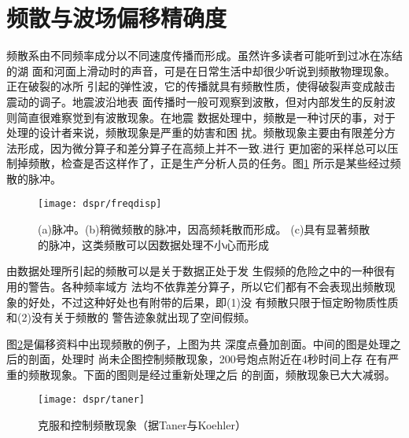 \section{频散与波场偏移精确度}
\label{sec:4.3}

频散系由不同频率成分以不同速度传播而形成。虽然许多读者可能听到过冰在冻结的湖
面和河面上滑动时的声音，可是在日常生活中却很少听说到频散物理现象。正在破裂的冰所
引起的弹性波，它的传播就具有频散性质，使得破裂声变成敲击震动的调子。地震波沿地表
面传播时一般可观察到波散，但对内部发生的反射波则简直很难察觉到有波散现象。在地震
数据处理中，频散是一种讨厌的事，对于处理的设计者来说，频散现象是严重的妨害和困
扰。频散现象主要由有限差分方法形成，因为微分算子和差分算子在高频上并不一致.进行
更加密的采样总可以压制掉频散，检查是否这样作了，正是生产分析人员的任务。图\ref{fig:dspr/freqdisp}
所示是某些经过频散的脉冲。

\begin{figure}[H]
\centering
\texttt{[image: dspr/freqdisp]}
\caption[freqdisp]{(a)脉冲。(b)稍微频散的脉冲，因高频耗散而形成。
(c)具有显著频散的脉冲，这类频散可以因数据处理不小心而形成}
\label{fig:dspr/freqdisp}
\end{figure}

由数据处理所引起的频散可以是关于数据正处于发
生假频的危险之中的一种很有用的警告。各种频率域方
法均不依靠差分算子，所以它们都有不会表现出频散现
象的好处，不过这种好处也有附带的后果，即(1)没
有频散只限于恒定盼物质性质和(2)没有关于频散的
警告迹象就出现了空间假频。

图\ref{fig:dspr/taner}是偏移资料中出现频散的例子，上图为共
深度点叠加剖面。中间的图是处理之后的剖面，处理时
尚未企图控制频散现象，200号炮点附近在4秒时间上存
在有严重的频散现象。下面的图则是经过重新处理之后
的剖面，频散现象已大大减弱。

\begin{figure}[H]
\centering
\texttt{[image: dspr/taner]}
\caption[taner]{克服和控制频散现象（据Taner与Koehler）}
\label{fig:dspr/taner}
\end{figure}





